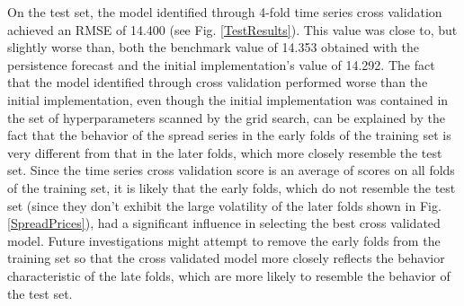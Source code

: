 \documentclass{article}
\begin{document}
On the test set, the model identified through 4-fold time series cross validation achieved an RMSE of 14.400 (see Fig. \ref{TestResults}). This value was close to, but slightly worse than, both the benchmark value of 14.353 obtained with the persistence forecast and the initial implementation's value of 14.292. The fact that the model identified through cross validation performed worse than the initial implementation, even though the initial implementation was contained in the set of hyperparameters scanned by the grid search, can be explained by the fact that the behavior of the spread series in the early folds of the training set is very different from that in the later folds, which more closely resemble the test set. Since the time series cross validation score is an average of scores on all folds of the training set, it is likely that the early folds, which do not resemble the test set (since they don't exhibit the large volatility of the later folds shown in Fig. \ref{SpreadPrices}), had a significant influence in selecting the best cross validated model. Future investigations might attempt to remove the early folds from the training set so that the cross validated model more closely reflects the behavior characteristic of the late folds, which are more likely to resemble the behavior of the test set. 





\end{document}
